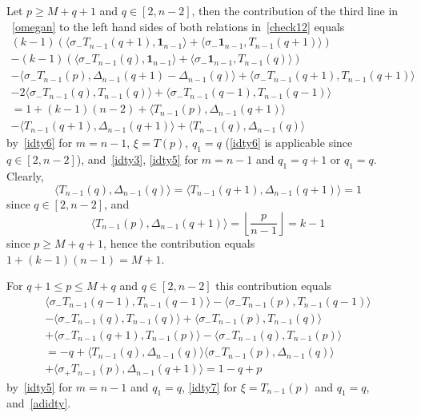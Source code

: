 \documentclass{amsart}
\theoremstyle{definition}
\theoremstyle{remark}
\numberwithin{equation}{section}
\numberwithin{theorem}{section}
\begin{document}
Let $p\ge M+q+1$ and $q\in [2,n-2]$, 
then the  contribution of the third line in ~\eqref{omegan} to the left hand 
sides of  both relations in~\eqref{check12} equals
\begin{equation*}
\begin{split} 
(k-1)\left(\langle \sigma_-T_{n-1}(q+1),{\mathbf 1}_{n-1}\rangle +\langle \sigma_-{\mathbf 1}_{n-1},T_{n-1}(q+1)\rangle\right)\\
-(k-1)\left(\langle \sigma_-T_{n-1}(q),{\mathbf 1}_{n-1}\rangle +\langle \sigma_-{\mathbf 1}_{n-1},T_{n-1}(q)\rangle\right)\\
-\langle \sigma_-T_{n-1}(p),\Delta_{n-1}(q+1)-\Delta_{n-1}(q)\rangle
+\langle \sigma_-T_{n-1}(q+1),T_{n-1}(q+1)\rangle\\
-2\langle \sigma_-T_{n-1}(q),T_{n-1}(q)\rangle+\langle \sigma_-T_{n-1}(q-1),T_{n-1}(q-1)\rangle\\
=1+(k-1)(n-2)+\langle T_{n-1}(p), \Delta_{n-1}(q+1)\rangle\\
-\langle T_{n-1}(q+1),\Delta_{n-1}(q+1)\rangle+\langle T_{n-1}(q),\Delta_{n-1}(q)\rangle
\end{split}
\end{equation*}
by~\eqref{idty6}  for $m=n-1$, $\xi=T(p)$, $q_1=q$ (\eqref{idty6} is applicable since $q\in [2,n-2]$), and~\eqref{idty3}, \eqref{idty5} for $m=n-1$ and $q_1=q+1$ or $q_1=q$.
Clearly,
\begin{equation}\label{adidty}
 \langle T_{n-1}(q),\Delta_{n-1}(q)\rangle=
 \langle T_{n-1}(q+1),\Delta_{n-1}(q+1)\rangle=1
\end{equation}
since $q\in [2,n-2]$, and 
$$
\langle T_{n-1}(p), \Delta_{n-1}(q+1)\rangle=\left\lfloor\frac p{n-1}\right\rfloor=k-1
$$
since $p\ge M+q+1$, hence the contribution equals $1+(k-1)(n-1)=M+1$.

For $q+1\le p\le M+q$ and $q\in [2,n-2]$ this contribution equals
\begin{equation*}
 \begin{split}
 \langle \sigma_-T_{n-1}(q-1), T_{n-1}(q-1)\rangle-
 \langle \sigma_-T_{n-1}(p), T_{n-1}(q-1)\rangle\\-
 \langle \sigma_-T_{n-1}(q), T_{n-1}(q)\rangle+
 \langle \sigma_-T_{n-1}(p), T_{n-1}(q)\rangle\\+
  \langle \sigma_-T_{n-1}(q+1), T_{n-1}(p)\rangle-
  \langle \sigma_-T_{n-1}(q), T_{n-1}(p)\rangle\\
 = -q+\langle T_{n-1}(q), \Delta_{n-1}(q)\rangle
  \langle \sigma_-T_{n-1}(p), \Delta_{n-1}(q)\rangle\\+
   \langle\sigma_+T_{n-1}(p), \Delta_{n-1}(q+1)\rangle
   =1-q+p
 \end{split}
 \end{equation*}
by~\eqref{idty5} for $m=n-1$ and $q_1=q$, \eqref{idty7} for $\xi=T_{n-1}(p)$ and $q_1=q$, and~\eqref{adidty}.
\end{document}
